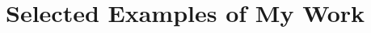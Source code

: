 \documentclass[12pt,english]{scrartcl}
\begin{document}
\section{Selected Examples of My Work}

\begin{comment}
\begin{description}
\item [{Peer-reviewed~journal~article}] Sean D. G. Marshall, Aubrey Moore,
Maclean Vaqalo, Alasdair Noble, and Trevor A. Jackson, \textquotedbl A
new haplotype of the coconut rhinoceros beetle, \emph{Oryctes rhinoceros},
has escaped biological control by \emph{Oryctes rhinoceros} nudivirus
and is invading Pacific Islands'', Journal of Invertebrate Pathology
149 (2017), pp. 127-{}-134.\cite{marshall2017anew}
\item [{Peer-reviewed~journal~article}] Jake Manuel, W. John Tennent,
Donald W. Buden, and Aubrey Moore, \textquotedbl First record of
\emph{Doleschallia tongana} (Lepidoptera: Nymphalidae) for Guam Island\textquotedbl ,
F1000Research 7 (2018), pp. 366.\cite{manuel2018firstrecord}
\item [{Grant~proposal}] Aubrey Moore, \textquotedbl DOI Proposal: Biological
Control of Coconut Rhinoceros Beetle Biotype G in Micronesia\textquotedbl{}
(2017).\cite{moore2017doiproposal}
\item [{Grant~proposal}] Aubrey Moore, \textquotedbl McIntire-Stennis
Proposal: Guam Forest Biodiversity Inventory\textquotedbl{} (2018).\cite{moore2018mcintirestennis}
\item [{Magazine~article}] Aubrey Moore, \textquotedbl Special Report
for Guam Invasive Species Awareness Week: Invasive Species are a Crisis
for Guam and the Pacific, Right Now\textquotedbl , Pacific Island
Times (2018).\cite{moore2018special}
\item [{Oral~presentation~slide~set}] Aubrey Moore, \textquotedbl Building
a Terrestrial Biodiversity Inventory for Guam\textquotedbl{} (2018).\cite{moore2018building}
\item [{Web~site}] \cite{moore2018crbgwiki} Aubrey Moore, \textquotedbl CRB-G
Wiki - CRB-G Wiki\textquotedbl{} (2018).
\end{description}
\raggedright\vspace{2mm}\textbf{Reference(s)}\begin{btSect}[vancouver]{zotero}
\btPrintCited
\end{btSect}
\end{btUnit}

\end{comment}

\clearpage
\begin{refsection}
\nocite{*}
\printbibliography[]
\end{refsection}
\end{document}
